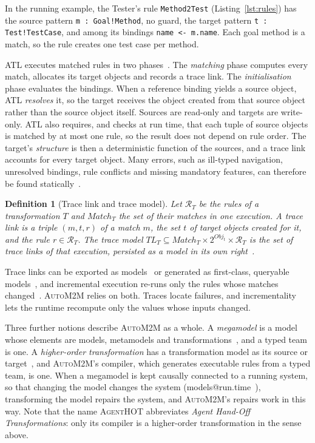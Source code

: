 \documentclass[pdflatex,sn-mathphys-num]{sn-jnl}
\theoremstyle{thmstyleone}%
\theoremstyle{thmstyletwo}%
\theoremstyle{thmstylethree}%
\newtheorem{definition}{Definition}%
\newcommand{\tool}{\textsc{AgentHOT}}
\newcommand{\auto}{\textsc{AutoM2M}}
\newcommand{\TL}{\mathit{TL}}
\newcommand{\code}[1]{\texttt{#1}}
\begin{document}
In the running example, the Tester's rule \code{Method2Test}
(Listing~\ref{lst:rules}) has the source pattern \code{m : Goal!Method}, no
guard, the target pattern \code{t : Test!TestCase}, and among its bindings
\code{name <- m.name}. Each goal method is a match, so the rule creates one
test case per method.

ATL executes matched rules in two phases~\cite{jouault2008atl}. The
\emph{matching} phase computes every match, allocates its target objects and
records a trace link. The \emph{initialisation} phase evaluates the bindings.
When a reference binding yields a source object, ATL \emph{resolves} it, so the
target receives the object created from that source object rather than the
source object itself. Sources are read-only and targets are write-only. ATL
also requires, and checks at run time, that each tuple of source objects is
matched by at most one rule, so the result does not depend on rule order. The
target's \emph{structure} is then a deterministic function of the sources, and
a trace link accounts for every target object. Many errors, such as ill-typed
navigation, unresolved bindings, rule conflicts and missing mandatory features,
can therefore be found statically~\cite{cuadrado2017static}.

\begin{definition}[Trace link and trace model]\label{def:trace}
Let $\mathcal{R}_T$ be the rules of a transformation $T$ and
$\mathit{Match}_T$ the set of their matches in one execution. A trace link is a
triple $(m,t,r)$ of a match $m$, the set $t$ of target objects created for it,
and the rule $r\in\mathcal{R}_T$. The \emph{trace model}
$\TL_T\subseteq\mathit{Match}_T\times 2^{\mathit{Obj}_t}\times\mathcal{R}_T$ is
the set of trace links of that execution, persisted as a model in its own
right~\cite{jouault2005traceability,vara2014metagem}.
\end{definition}

Trace links can be exported as models~\cite{jouault2005traceability} or
generated as first-class, queryable models~\cite{vara2014metagem}, and
incremental execution re-runs only the rules whose matches
changed~\cite{jouault2010incremental}. \auto{} relies on both. Traces locate
failures, and incrementality lets the runtime recompute only the values whose
inputs changed.

Three further notions describe \auto{} as a whole. A \emph{megamodel} is a
model whose elements are models, metamodels and
transformations~\cite{bezivin2005unification}, and a typed team is one. A
\emph{higher-order transformation} has a transformation model as its source or
target~\cite{tisi2009hot}, and \auto{}'s compiler, which generates executable
rules from a typed team, is one. When a megamodel is kept causally connected
to a running system, so that changing the model changes the system
(models@run.time~\cite{blair2009runtime}), transforming the model repairs the
system, and \auto{}'s repairs work in this way. Note that the name \tool{}
abbreviates \emph{Agent Hand-Off Transformations}: only its compiler is a
higher-order transformation in the sense above.
\end{document}
